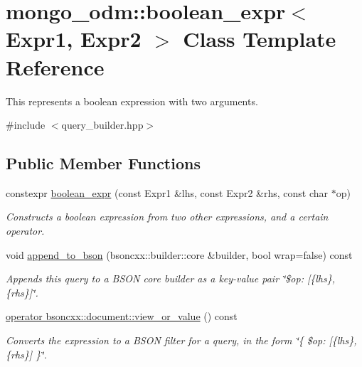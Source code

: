 \hypertarget{classmongo__odm_1_1boolean__expr}{}\section{mongo\+\_\+odm\+:\+:boolean\+\_\+expr$<$ Expr1, Expr2 $>$ Class Template Reference}
\label{classmongo__odm_1_1boolean__expr}


This represents a boolean expression with two arguments.  




{\ttfamily \#include $<$query\+\_\+builder.\+hpp$>$}

\subsection*{Public Member Functions}
\begin{DoxyCompactItemize}
\item 
constexpr \hyperlink{classmongo__odm_1_1boolean__expr_a78c7a59f9f857fe8d5609493f155d96a}{boolean\+\_\+expr} (const Expr1 \&lhs, const Expr2 \&rhs, const char $\ast$op)
\begin{DoxyCompactList}\small\item\em Constructs a boolean expression from two other expressions, and a certain operator. \end{DoxyCompactList}\item 
void \hyperlink{classmongo__odm_1_1boolean__expr_ad74cd57820615fe960f4489af2091bbd}{append\+\_\+to\+\_\+bson} (bsoncxx\+::builder\+::core \&builder, bool wrap=false) const 
\begin{DoxyCompactList}\small\item\em Appends this query to a B\+S\+ON core builder as a key-\/value pair \char`\"{}\$op\+: \mbox{[}\{lhs\}, \{rhs\}\mbox{]}\char`\"{}. \end{DoxyCompactList}\item 
\hyperlink{classmongo__odm_1_1boolean__expr_af5fb062846c5f8fb95a8333ad9723006}{operator bsoncxx\+::document\+::view\+\_\+or\+\_\+value} () const \hypertarget{classmongo__odm_1_1boolean__expr_af5fb062846c5f8fb95a8333ad9723006}{}\label{classmongo__odm_1_1boolean__expr_af5fb062846c5f8fb95a8333ad9723006}

\begin{DoxyCompactList}\small\item\em Converts the expression to a B\+S\+ON filter for a query, in the form \char`\"{}\{ \$op\+: \mbox{[}\{lhs\}, \{rhs\}\mbox{]} \}\char`\"{}. \end{DoxyCompactList}\end{DoxyCompactItemize}


